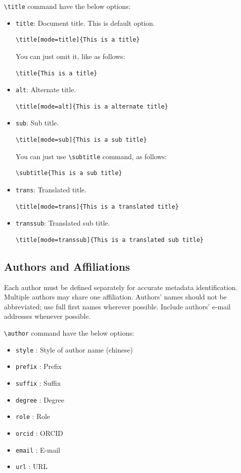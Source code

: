 \documentclass[]{ceurart}
\begin{document}
\verb|\title| command have the below options:
\begin{itemize}
\item \verb|title|: Document title. This is default option. 
\begin{verbatim}
\title[mode=title]{This is a title}
\end{verbatim}
You can just omit it, like as follows:
\begin{verbatim}
\title{This is a title}
\end{verbatim}

\item \verb|alt|: Alternate title.
\begin{verbatim}
\title[mode=alt]{This is a alternate title}
\end{verbatim}

\item \verb|sub|: Sub title.
\begin{verbatim}
\title[mode=sub]{This is a sub title}
\end{verbatim}
You can just use \verb|\subtitle| command, as follows:
\begin{verbatim}
\subtitle{This is a sub title}
\end{verbatim}

\item \verb|trans|: Translated title.
\begin{verbatim}
\title[mode=trans]{This is a translated title}
\end{verbatim}

\item \verb|transsub|: Translated sub title.
\begin{verbatim}
\title[mode=transsub]{This is a translated sub title}
\end{verbatim}
\end{itemize}

\subsection{Authors and Affiliations}

Each author must be defined separately for accurate metadata
identification. Multiple authors may share one affiliation. Authors'
names should not be abbreviated; use full first names wherever
possible. Include authors' e-mail addresses whenever possible.

\verb|\author| command have the below options: 

\begin{itemize}
\item \verb|style| : Style of author name (chinese)
\item \verb|prefix| : Prefix
\item \verb|suffix| : Suffix
\item \verb|degree| : Degree
\item \verb|role| : Role
\item \verb|orcid| : ORCID
\item \verb|email| : E-mail
\item \verb|url| : URL
\end{itemize}
\end{document}
